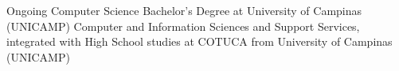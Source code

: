 %
%
%


\begin{scholarship}
					{Ongoing Computer Science Bachelor's Degree at University of Campinas (UNICAMP)}
	\emptySeparator
					{Computer and Information Sciences and Support Services, integrated with High School
					studies at COTUCA from University of Campinas (UNICAMP)}

\end{scholarship}
